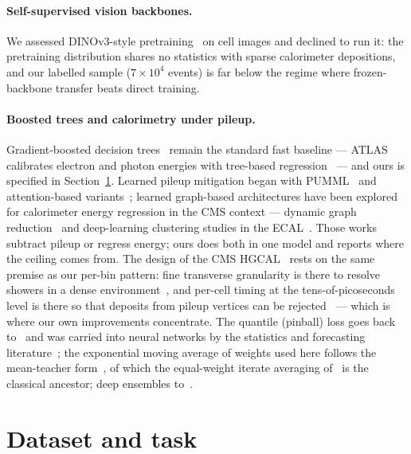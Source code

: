 \documentclass[11pt,a4paper]{article}
\begin{document}
\paragraph{Self-supervised vision backbones.}
We assessed DINOv3-style pretraining~\cite{dinov3} on cell images and
declined to run it: the pretraining distribution shares no statistics with
sparse calorimeter depositions, and our labelled sample ($7\times10^4$
events) is far below the regime where frozen-backbone transfer beats direct
training.

\paragraph{Boosted trees and calorimetry under pileup.}
Gradient-boosted decision trees~\cite{xgboost,lightgbm} remain the standard
fast baseline --- ATLAS calibrates electron and photon energies with
tree-based regression~\cite{atlascalib} --- and ours is specified in
Section~\ref{sec:data}. Learned pileup mitigation began with
PUMML~\cite{pumml} and attention-based variants~\cite{abcnet}; learned
graph-based architectures have been explored for calorimeter energy
regression in the CMS context --- dynamic graph reduction~\cite{drn} and
deep-learning clustering studies in the ECAL~\cite{cmsecaldl}.
Those works subtract pileup or regress energy; ours does both in one model
and reports where the ceiling comes from. The design of the CMS HGCAL~\cite{hgcal,hgcaltiming} rests on the same
premise as our per-bin pattern: fine transverse granularity is there to
resolve showers in a dense environment~\cite{hgcal}, and per-cell timing at
the tens-of-picoseconds level is there so that deposits from pileup vertices
can be rejected~\cite{hgcaltiming} --- which is where our own improvements
concentrate. The quantile (pinball) loss goes back to~\cite{koenker} and was carried
into neural networks by the statistics and forecasting
literature~\cite{white92,qrnn}; the
exponential moving average of weights used here follows the mean-teacher
form~\cite{meanteacher}, of which the equal-weight iterate averaging
of~\cite{polyak} is the classical ancestor; deep ensembles
to~\cite{deepens}.

\section{Dataset and task}
\label{sec:data}
\end{document}
